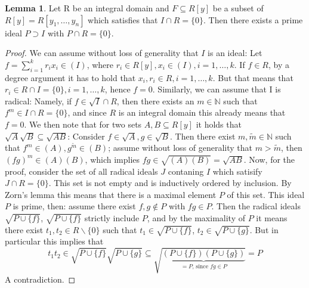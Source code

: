 \documentclass{article}
\def\N{\mathbb{N}}
\theoremstyle{definition}
\newtheorem{lem}[Satz]{Lemma}
\begin{document}
\begin{lem}\label{primeoverp1}
Let R be an integral domain and $F \subseteq R[y]$ be a subset of $R[y] = R[y_1,\ldots,y_n]$ which satisfies that $I \cap R = \{ 0 \}$.
Then there exists a prime ideal $P \supset I$ with $P \cap R = \{0\}$.
\begin{proof}
We can assume without loss of generality that $I$ is an ideal: Let $f = \sum_{i=1}^kr_i x_i \in (I)$, where $r_i \in R[y], x_i \in (I), i = 1,\ldots,k$. If $f \in R$, by a degree argument it has to hold that $x_i, r_i \in R, i=1,\ldots,k$.
But that means that $r_i \in R \cap I = \{0\}, i=1,\ldots,k$, hence $f = 0$. Similarly, we can assume that I is radical:
Namely, if $f \in \sqrt{I} \cap R$, then there exists an $m \in \N$ such that $f^m \in I \cap R = \{0\}$, and since $R$ is an integral domain this already means that $f = 0$.
We then note that for two sets $A,B \subseteq R[y]$ it holds that $\sqrt{A}\sqrt{B} \subseteq \sqrt{AB}$: Consider $f \in \sqrt{A}, g \in \sqrt{B}$. Then there exist $m, \tilde m \in \N$ such that $f^m \in (A), g^{\tilde m} \in (B)$;
 assume without loss of generality that $m > \tilde m$, then $(fg)^m \in (A)(B)$, which implies $fg \in \sqrt{(A)(B)} = \sqrt{AB}$.
Now, for the proof, consider the set of all radical ideals $J$ contaning $I$ which satisify $J \cap R = \{0\}$. This set is not empty and is inductively ordered by inclusion.
By Zorn's lemma this means that there is a maximal element $P$ of this set. This ideal $P$ is prime, then: assume there exist $f,g \notin P$ with $fg \in P$. 
Then the radical ideals $\sqrt{P \cup \{f\}}$, $\sqrt{P \cup \{f\}}$ strictly include $P$, and by the maximality of $P$ it means there exist $t_1, t_2 \in R\backslash\{0\}$ such that
$t_1 \in \sqrt{P \cup \{f\}}$, $t_2 \in \sqrt{P \cup \{g\}}$. But in particular this implies that
 \[t_1t_2 \in \sqrt{P \cup \{f\}}\sqrt{P \cup \{g\}} \subseteq \sqrt{ \underbrace{(P \cup \{f\})(P \cup \{g\})}_{=P\text{, since }fg \in P}} = P\]
A contradiction.
\end{proof}
\end{lem}
\end{document}
